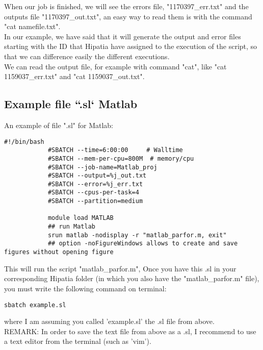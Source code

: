\documentclass[a4paper]{article}
\begin{document}
            When our job is finished, we will see the errors file, "1170397\_err.txt" and the outputs file "1170397\_out.txt", an easy way to read them is with the command "cat namefile.txt".\\
			In our example, we have said that it will generate the output and error files starting with the ID that Hipatia have assigned to the execution of the script, so that we can difference easily the different executions.\\
			We can read the output file, for example with command "cat", like "cat 1159037\_err.txt" and "cat 1159037\_out.txt".\\
	\subsection{ Example file ``.sl` Matlab}
		An example of file ".sl" for Matlab:
		\begin{lstlisting}[caption=scp command, label=lst:scpCommand]
			#!/bin/bash
			#SBATCH --time=6:00:00     # Walltime 
			#SBATCH --mem-per-cpu=800M  # memory/cpu 
			#SBATCH --job-name=Matlab_proj 
			#SBATCH --output=%j_out.txt
			#SBATCH --error=%j_err.txt
			#SBATCH --cpus-per-task=4 
			#SBATCH --partition=medium
			
			module load MATLAB
			## run Matlab
			srun matlab -nodisplay -r "matlab_parfor.m, exit" 
			## option -noFigureWindows allows to create and save figures without opening figure
		\end{lstlisting}
		This will run the script "matlab\_parfor.m", 
		Once you have this .sl in your corresponding Hipatia folder (in which you also have the "matlab\_parfor.m" file), you must write the following command on terminal:
		\begin{lstlisting}[caption=scp command, label=lst:scpCommand]
			sbatch example.sl
		\end{lstlisting}
		where I am assuming you called 'example.sl' the .sl file from above.
		\\
		REMARK: In order to save the text file from above as a .sl, I recommend to use a text editor from the terminal (such as 'vim').
\end{document}
